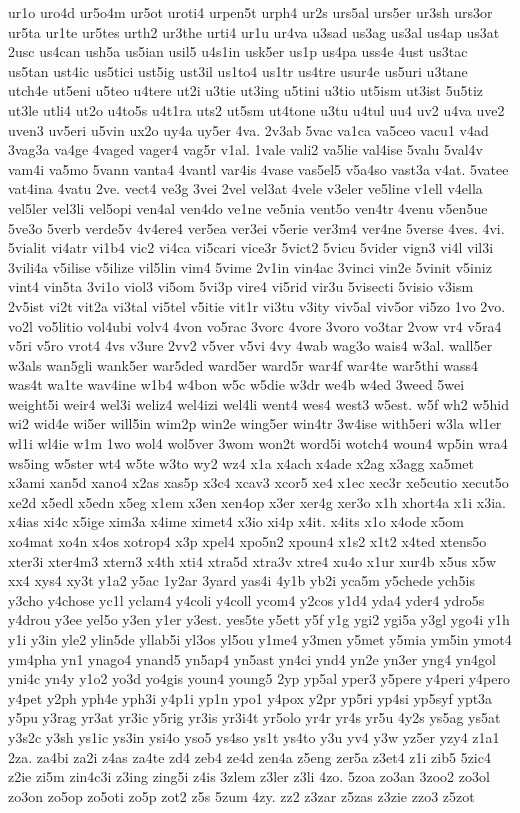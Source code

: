 {ur1o
uro4d
ur5o4m
ur5ot
uroti4
urpen5t
urph4
ur2s
urs5al
urs5er
ur3sh
urs3or
ur5ta
ur1te
ur5tes
urth2
ur3the
urti4
ur1u
ur4va
u3sad
us3ag
us3al
us4ap
us3at
2usc
us4can
ush5a
us5ian
usil5
u4s1in
usk5er
us1p
us4pa
uss4e
4ust
us3tac
us5tan
ust4ic
us5tici
ust5ig
ust3il
us1to4
us1tr
us4tre
usur4e
us5uri
u3tane
utch4e
ut5eni
u5teo
u4tere
ut2i
u3tie
ut3ing
u5tini
u3tio
ut5ism
ut3ist
5u5tiz
ut3le
utli4
ut2o
u4to5s
u4t1ra
uts2
ut5sm
ut4tone
u3tu
u4tul
uu4
uv2
u4va
uve2
uven3
uv5eri
u5vin
ux2o
uy4a
uy5er
4va.
2v3ab
5vac
va1ca
va5ceo
vacu1
v4ad
3vag3a
va4ge
4vaged
vager4
vag5r
v1al.
1vale
vali2
va5lie
val4ise
5valu
5val4v
vam4i
va5mo
5vann
vanta4
4vantl
var4is
4vase
vas5el5
v5a4so
vast3a
v4at.
5vatee
vat4ina
4vatu
2ve.
vect4
ve3g
3vei
2vel
vel3at
4vele
v3eler
ve5line
v1ell
v4ella
vel5ler
vel3li
vel5opi
ven4al
ven4do
ve1ne
ve5nia
vent5o
ven4tr
4venu
v5en5ue
5ve3o
5verb
verde5v
4v4ere4
ver5ea
ver3ei
v5erie
ver3m4
ver4ne
5verse
4ves.
4vi.
5vialit
vi4atr
vi1b4
vic2
vi4ca
vi5cari
vice3r
5vict2
5vicu
5vider
vign3
vi4l
vil3i
3vili4a
v5ilise
v5ilize
vil5lin
vim4
5vime
2v1in
vin4ac
3vinci
vin2e
5vinit
v5iniz
vint4
vin5ta
3vi1o
viol3
vi5om
5vi3p
vire4
vi5rid
vir3u
5visecti
5visio
v3ism
2v5ist
vi2t
vit2a
vi3tal
vi5tel
v5itie
vit1r
vi3tu
v3ity
viv5al
viv5or
vi5zo
1vo
2vo.
vo2l
vo5litio
vol4ubi
volv4
4von
vo5rac
3vorc
4vore
3voro
vo3tar
2vow
vr4
v5ra4
v5ri
v5ro
vrot4
4vs
v3ure
2vv2
v5ver
v5vi
4vy
4wab
wag3o
wais4
w3al.
wall5er
w3als
wan5gli
wank5er
war5ded
ward5er
ward5r
war4f
war4te
war5thi
wass4
was4t
wa1te
wav4ine
w1b4
w4bon
w5c
w5die
w3dr
we4b
w4ed
3weed
5wei
weight5i
weir4
wel3i
weliz4
wel4izi
wel4li
went4
wes4
west3
w5est.
w5f
wh2
w5hid
wi2
wid4e
wi5er
will5in
wim2p
win2e
wing5er
win4tr
3w4ise
with5eri
w3la
wl1er
wl1i
wl4ie
w1m
1wo
wol4
wol5ver
3wom
won2t
word5i
wotch4
woun4
wp5in
wra4
ws5ing
w5ster
wt4
w5te
w3to
wy2
wz4
x1a
x4ach
x4ade
x2ag
x3agg
xa5met
x3ami
xan5d
xano4
x2as
xas5p
x3c4
xcav3
xcor5
xe4
x1ec
xec3r
xe5cutio
xecut5o
xe2d
x5edl
x5edn
x5eg
x1em
x3en
xen4op
x3er
xer4g
xer3o
x1h
xhort4a
x1i
x3ia.
x4ias
xi4c
x5ige
xim3a
x4ime
ximet4
x3io
xi4p
x4it.
x4its
x1o
x4ode
x5om
xo4mat
xo4n
x4os
xotrop4
x3p
xpel4
xpo5n2
xpoun4
x1s2
x1t2
x4ted
xtens5o
xter3i
xter4m3
xtern3
x4th
xti4
xtra5d
xtra3v
xtre4
xu4o
x1ur
xur4b
x5us
x5w
xx4
xys4
xy3t
y1a2
y5ac
1y2ar
3yard
yas4i
4y1b
yb2i
yca5m
y5chede
ych5is
y3cho
y4chose
yc1l
yclam4
y4coli
y4coll
ycom4
y2cos
y1d4
yda4
yder4
ydro5s
y4drou
y3ee
yel5o
y3en
y1er
y3est.
yes5te
y5ett
y5f
y1g
ygi2
ygi5a
y3gl
ygo4i
y1h
y1i
y3in
yle2
ylin5de
yllab5i
yl3os
yl5ou
y1me4
y3men
y5met
y5mia
ym5in
ymot4
ym4pha
yn1
ynago4
ynand5
yn5ap4
yn5ast
yn4ci
ynd4
yn2e
yn3er
yng4
yn4gol
yni4c
yn4y
y1o2
yo3d
yo4gis
youn4
young5
2yp
yp5al
yper3
y5pere
y4peri
y4pero
y4pet
y2ph
yph4e
yph3i
y4p1i
yp1n
ypo1
y4pox
y2pr
yp5ri
yp4si
yp5syf
ypt3a
y5pu
y3rag
yr3at
yr3ic
y5rig
yr3is
yr3i4t
yr5olo
yr4r
yr4s
yr5u
4y2s
ys5ag
ys5at
y3s2c
y3sh
ys1ic
ys3in
ysi4o
yso5
ys4so
ys1t
ys4to
y3u
yv4
y3w
yz5er
yzy4
z1a1
2za.
za4bi
za2i
z4as
za4te
zd4
zeb4
ze4d
zen4a
z5eng
zer5a
z3et4
z1i
zib5
5zic4
z2ie
zi5m
zin4c3i
z3ing
zing5i
z4is
3zlem
z3ler
z3li
4zo.
5zoa
zo3an
3zoo2
zo3ol
zo3on
zo5op
zo5oti
zo5p
zot2
z5s
5zum
4zy.
zz2
z3zar
z5zas
z3zie
zzo3
z5zot
}
